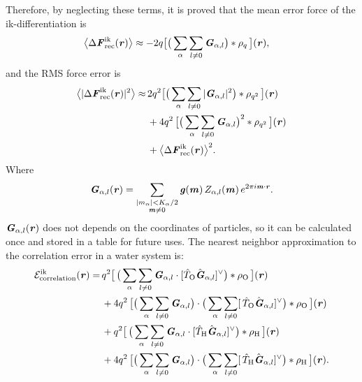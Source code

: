 \documentclass[aps,pre,preprint,unsortedaddress]{revtex4}
\renewcommand{\v}[1]{\textbf{\textit{#1}}}
\begin{document}
Therefore, by neglecting these terms, it is proved that the mean error
force of the ik-differentiation is
\begin{align}\label{eqn:ik.meanf}
  \big\langle
  \Delta\v F_{\textrm{rec}}^{\textrm{ik}}(\v r)
  \big\rangle
  & \approx
  - 2 q
  \big[
  \big(
  \sum_{\alpha}\sum_{l\neq 0}\v G_{\alpha,l}
  \big)
  \ast\rho_q\,
  \big] (\v r),
\end{align}
and the RMS force error is 
\begin{align}\nonumber
  \big\langle
  \vert\Delta\v F_{\textrm{rec}}^{\textrm{ik}}(\v r)\vert^2
  \big\rangle
  \approx&\, 
  2q^2
  \big[
  \big(
  \sum_{\alpha} \sum_{l\neq 0}
  \vert \v G_{\alpha,l}\vert^2
  \big)
  \ast \rho_{q^2}
  \,\big] (\v r)\\\nonumber
  &\,+
  4q^2\,
  \big[
  \big(
  \sum_{\alpha} \sum_{l\neq 0}  
  \v G_{\alpha,l}
  \big)^2
  \ast \rho_{q^2}\,
  \big] (\v r) \\\label{eqn:ik.error}
  &\,+
  \big\langle
  \Delta\v F_{\textrm{rec}}^{\textrm{ik}}(\v r)
  \big\rangle^2.
\end{align}
Where
\begin{align}
  \v G_{\alpha,l}(\v r) =
  \sum_{
    \begin{subarray}{c}
      \vert m_{\alpha}\vert < K_\alpha/2\\
      \v m\neq 0
    \end{subarray}}
  \v g(\v m)\,
  Z_{\alpha,l}(\v m)\,
  e^{2\pi i\v m\cdot\v r}.
\end{align}
$\v G_{\alpha,l}(\v r)$ does not depends on the coordinates of particles,
so it can be calculated once and stored in a table for future uses.
The nearest neighbor approximation to the correlation error
in a water system is:
\begin{align}\nonumber
  \mathcal E^{\textrm{ik}}_{\textrm{correlation}}(\v r)
  =\,&
  q^2
  \big[\,
  \big(
  \sum_{\alpha} \sum_{l\neq 0}
  \v G_{\alpha,l}\cdot[\hat T_{\textrm{O}}\hat{\v G}_{\alpha,l}]^{\vee}
  \big)
  \ast \rho_{\textrm{O}}
  \,\big] (\v r) \\\nonumber
  \,&+
  4q^2\,
  \big[
  \big(
  \sum_{\alpha} \sum_{l\neq 0}  
  \v G_{\alpha,l}
  \big)
  \cdot
  \big(
  \sum_{\alpha} \sum_{l\neq 0}  
  [\,\hat T_{\textrm{O}}\hat{\v G}_{\alpha,l}]^{\vee}
  \big)
  \ast \rho_{\textrm{O}}\,
  \big] (\v r) \\\nonumber
  \,&+
  q^2
  \big[\,
  \big(
  \sum_{\alpha} \sum_{l\neq 0}
  \v G_{\alpha,l}\cdot[\hat T_{\textrm{H}}\hat{\v G}_{\alpha,l}]^{\vee}
  \big)
  \ast \rho_{\textrm{H}}
  \,\big] (\v r) \\
  \,&+
  4q^2\,
  \big[
  \big(
  \sum_{\alpha} \sum_{l\neq 0}  
  \v G_{\alpha,l}
  \big)
  \cdot
  \big(
  \sum_{\alpha} \sum_{l\neq 0}  
  [\,\hat T_{\textrm{H}}\hat{\v G}_{\alpha,l}]^{\vee}
  \big)
  \ast \rho_{\textrm{H}}\,
  \big] (\v r).
\end{align}
\end{document}
